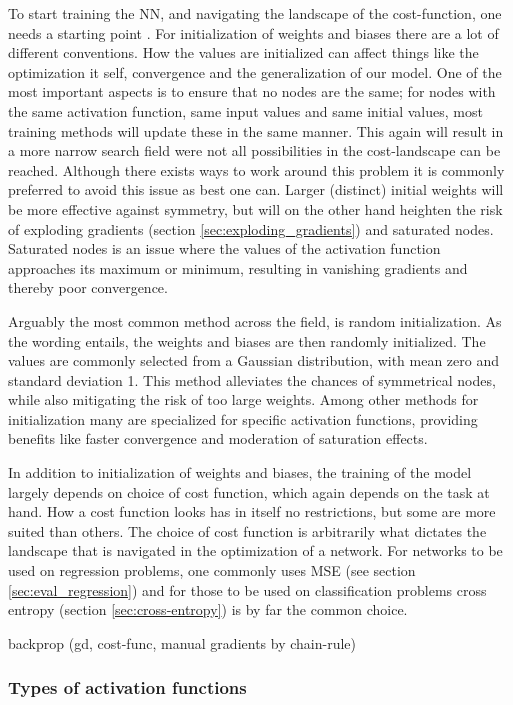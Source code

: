 To start training the NN, and navigating the landscape of the cost-function, one needs a starting point \citep[p.297]{Goodfellow-et-al-2016}. For initialization of weights and biases there are a lot of different conventions. How the values are initialized can affect things like the optimization it self, convergence and the generalization of our model. One of the most important aspects is to ensure that no nodes are the same; for nodes with the same activation function, same input values and same initial values, most training methods will update these in the same manner. This again will result in a more narrow search field were not all possibilities in the cost-landscape can be reached. Although there exists ways to work around this problem it is commonly preferred to avoid this issue as best one can. Larger (distinct) initial weights will be more effective against symmetry, but will on the other hand heighten the risk of exploding gradients (section \ref{sec:exploding_gradients}) and saturated nodes. Saturated nodes is an issue where the values of the activation function approaches its maximum or minimum, resulting in vanishing gradients and thereby poor convergence. 

Arguably the most common method across the field, is random initialization. As the wording entails, the weights and biases are then randomly initialized. The values are commonly selected from a Gaussian distribution, with mean zero and standard deviation 1. This method alleviates the chances of symmetrical nodes, while also mitigating the risk of too large weights. Among other methods for initialization many are specialized for specific activation functions, providing benefits like faster convergence and moderation of saturation effects. 

In addition to initialization of weights and biases, the training of the model largely depends on choice of cost function, which again depends on the task at hand. How a cost function looks has in itself no restrictions, but some are more suited than others. 
The choice of cost function is arbitrarily what dictates the landscape that is navigated in the optimization of a network. 
For networks to be used on regression problems, one commonly uses MSE (see section \ref{sec:eval_regression}) and for those to be used on classification problems cross entropy (section \ref{sec:cross-entropy}) is by far the common choice. 

backprop (gd, cost-func, manual gradients by chain-rule)

\subsubsection{Types of activation functions}


